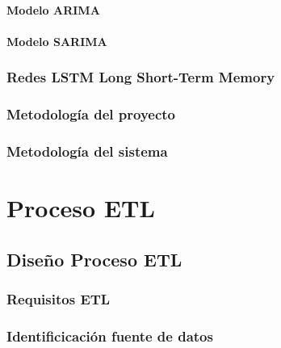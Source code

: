 \documentclass[letterpaper, 12pt]{report}
\begin{document}
\subsubsection{Modelo ARIMA}

\subsubsection{Modelo SARIMA}


\subsection{Redes LSTM Long Short-Term Memory}


\subsection{Metodología del proyecto}


\subsection{Metodología del sistema}


\chapter{Proceso ETL}


\section{Diseño Proceso ETL}


\subsection{Requisitos ETL}


\subsection{Identificicación fuente de datos}

\end{document}
